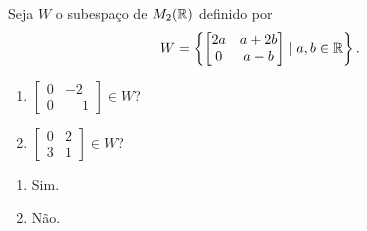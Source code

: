 \documentclass[12pt]{exam}
\begin{document}
\begin{exercicio}
  Seja $W$ o subespa\c{c}o de $M_2(\mathbb{R})$ definido por
  \[
  W = \left\{\begin{bmatrix}2a & a + 2b\\0 & a - b\end{bmatrix} \mid a, b \in \mathbb{R}\right\}.
  \]
  \begin{enumerate}[label={\alph*})]
    \item $\begin{bmatrix}0 & -2\\0 & \phantom{-} 1\end{bmatrix} \in W$?

    \item $\begin{bmatrix}0 & 2\\3 & 1\end{bmatrix} \in W$?
  \end{enumerate}
  \begin{solucao}
    \begin{enumerate}[label={\alph*})]
      \item Sim.

      \item N\~ao.
    \end{enumerate}
  \end{solucao}
\end{exercicio}
\end{document}
